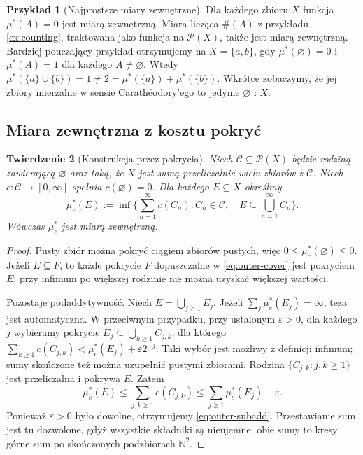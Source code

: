 \documentclass[11pt,a4paper,oneside]{book}
\numberwithin{equation}{chapter}
\theoremstyle{plain}
\newtheorem{twierdzenie}{Twierdzenie}[chapter]
\theoremstyle{definition}
\newtheorem{przyklad}[twierdzenie]{Przykład}
\theoremstyle{remark}
\begin{document}
\begin{przyklad}[Najprostsze miary zewnętrzne]
Dla każdego zbioru $X$ funkcja $\mu^*(A)=0$ jest miarą zewnętrzną.
Miara licząca $\#(A)$ z przykładu \ref{ex:counting}, traktowana
jako funkcja na $\mathcal P(X)$, także jest miarą zewnętrzną.
Bardziej pouczający przykład otrzymujemy na $X=\{a,b\}$, gdy
$\mu^*(\varnothing)=0$ i $\mu^*(A)=1$ dla każdego $A\ne\varnothing$.
Wtedy $\mu^*(\{a\}\cup\{b\})=1\ne2=\mu^*(\{a\})+\mu^*(\{b\})$.
Wkrótce zobaczymy, że jej zbiory mierzalne w sensie Carathéodory'ego
to jedynie $\varnothing$ i $X$.
\end{przyklad}

\subsection{Miara zewnętrzna z kosztu pokryć}

\begin{twierdzenie}[Konstrukcja przez pokrycia]
\label{thm:outer-from-cover}
Niech $\mathcal C\subseteq\mathcal P(X)$ będzie rodziną zawierającą
$\varnothing$ oraz taką, że $X$ jest sumą przeliczalnie wielu zbiorów
z $\mathcal C$. Niech $c:\mathcal C\to[0,\infty]$ spełnia
$c(\varnothing)=0$. Dla każdego $E\subseteq X$ określmy
\begin{equation}\label{eq:outer-cover}
\mu_c^*(E):=\inf\Big\{\sum_{n=1}^\infty c(C_n):
C_n\in\mathcal C,\quad E\subseteq\bigcup_{n=1}^\infty C_n\Big\}.
\end{equation}
Wówczas $\mu_c^*$ jest miarą zewnętrzną.
\end{twierdzenie}

\begin{proof}
Pusty zbiór można pokryć ciągiem zbiorów pustych, więc
$0\le\mu_c^*(\varnothing)\le0$. Jeżeli $E\subseteq F$, to każde
pokrycie $F$ dopuszczalne w \eqref{eq:outer-cover} jest pokryciem $E$;
przy infimum po większej rodzinie nie można uzyskać większej wartości.

Pozostaje podaddytywność. Niech $E=\bigcup_{j\ge1}E_j$.
Jeżeli $\sum_j\mu_c^*(E_j)=\infty$, teza jest automatyczna.
W przeciwnym przypadku, przy ustalonym $\varepsilon>0$, dla każdego
$j$ wybieramy pokrycie $E_j\subseteq\bigcup_{k\ge1}C_{j,k}$, dla
którego
$\sum_{k\ge1}c(C_{j,k})<\mu_c^*(E_j)+\varepsilon2^{-j}$.
Taki wybór jest możliwy z definicji infimum; sumy skończone też
można uzupełnić pustymi zbiorami. Rodzina
$\{C_{j,k}:j,k\ge1\}$ jest przeliczalna i pokrywa $E$. Zatem
\[
\mu_c^*(E)\le \sum_{j,k\ge1}c(C_{j,k})
\le\sum_{j\ge1}\mu_c^*(E_j)+\varepsilon.
\]
Ponieważ $\varepsilon>0$ było dowolne, otrzymujemy
\eqref{eq:outer-subadd}. Przestawianie sum jest tu dozwolone,
gdyż wszystkie składniki są nieujemne: obie sumy to kresy górne
sum po skończonych podzbiorach $\mathbb N^2$.
\end{proof}
\end{document}
